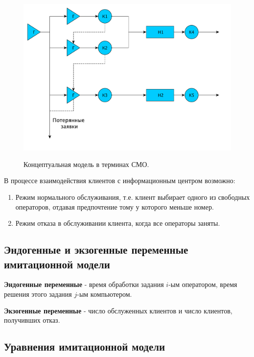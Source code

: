 \documentclass[a4paper,12pt]{article}
\begin{document}
	\begin{figure}[h!]
		\begin{center}
			{\includegraphics[scale = 0.6]{model2.pdf}}
			\label{ris:model2}
		\end{center}
		\caption{Концептуальная модель в терминах СМО.}
	\end{figure}
	
	В процессе взаимодействия клиентов с информационным центром возможно:
	\begin{enumerate}
		\item Режим нормального обслуживания, т.е. клиент выбирает одного из свободных операторов, отдавая предпочтение тому у которого меньше номер.
		\item Режим отказа в обслуживании клиента, когда все операторы заняты.
	\end{enumerate}
	
	\newpage
	
	\subsection*{Эндогенные и экзогенные переменные имитационной модели}
	
	{\bf Эндогенные переменные} - время обработки задания $i$-ым оператором,
	время решения этого задания $j$-ым компьютером.
	
	{\bf Экзогенные переменные} - число обслуженных клиентов и число клиентов, получивших отказ.
	
	\subsection*{Уравнения имитационной модели}
	
\end{document}
